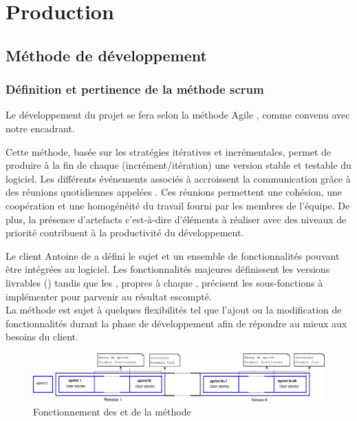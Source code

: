 \chapter{Production}
\section{Méthode de développement}
\subsection{Définition et pertinence de la méthode scrum}
Le développement du projet se fera selon la méthode Agile , comme convenu avec notre encadrant.

Cette méthode, basée sur les stratégies itératives et incrémentales, permet de produire à la fin de chaque  (incrément/itération) une version stable et testable du logiciel. Les différents événements associés à  accroissent la communication grâce à des réunions quotidiennes appelées . Ces réunions permettent une cohésion, une coopération et une homogénéité du travail fourni par les membres de l'équipe. De plus, la présence d'artefacts c'est-à-dire d'éléments à réaliser avec des niveaux de priorité contribuent à la productivité du développement.
 
Le client Antoine de  a défini le sujet et un ensemble de fonctionnalités pouvant être intégrées au logiciel. Les fonctionnalités majeures définissent les versions livrables () tandis que les , propres à chaque , précisent les sous-fonctions à implémenter pour parvenir au résultat escompté. \\
La méthode  est sujet à quelques flexibilités tel que l'ajout ou la modification de fonctionnalités durant la phase de développement afin de répondre au mieux aux besoins du client.  

\begin{figure}[H]
	\centering
	\includegraphics[width=18cm]{screens/scrum.eps}
	\caption{Fonctionnement des  et  de la méthode }
\end{figure}

